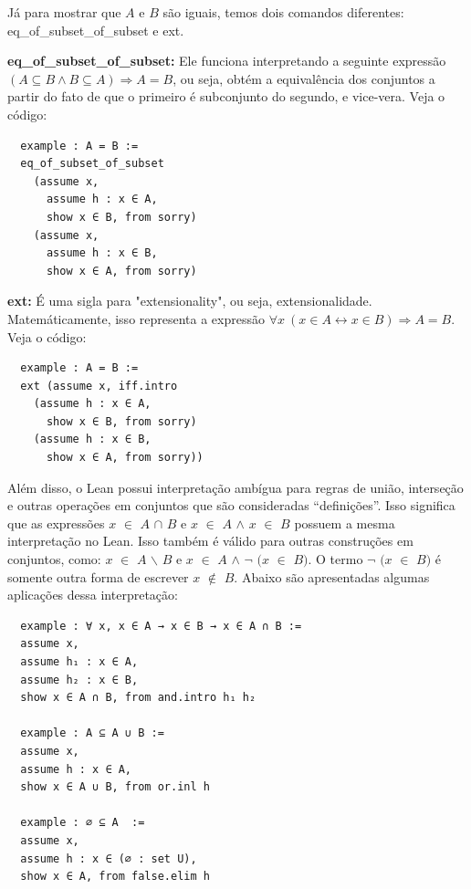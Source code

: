   Já para mostrar que $A$ e $B$ são iguais, temos dois comandos diferentes: {\selectfont eq\_of\_subset\_of\_subset} e {\selectfont ext}.

  \textbf{eq\_of\_subset\_of\_subset:} Ele funciona interpretando a seguinte expressão $(A \subseteq B \wedge B \subseteq A) \Rightarrow A=B$, ou seja, obtém a equivalência dos conjuntos a partir do fato de que o primeiro é subconjunto do segundo, e vice-vera. Veja o código:

  \begin{lstlisting}
  example : A = B :=
  eq_of_subset_of_subset
    (assume x,
      assume h : x ∈ A,
      show x ∈ B, from sorry)
    (assume x,
      assume h : x ∈ B,
      show x ∈ A, from sorry) \end{lstlisting}

  \textbf{ext:} É uma sigla para "extensionality", ou seja, extensionalidade. Matemáticamente, isso representa a expressão $\forall x \ (x \in A \leftrightarrow x \in B) \Rightarrow A=B$. Veja o código:

  \begin{lstlisting}
  example : A = B :=
  ext (assume x, iff.intro
    (assume h : x ∈ A,
      show x ∈ B, from sorry)
    (assume h : x ∈ B,
      show x ∈ A, from sorry)) \end{lstlisting}

  Além disso, o Lean possui interpretação ambígua para regras de união, interseção e outras operações em conjuntos que são consideradas “definições”. Isso significa que as expressões $x$ $\in$ $A$ $\cap$ $B$ e $x$ $\in$ $A$ $\wedge$ $x$ $\in$ $B$ possuem a mesma interpretação no Lean. Isso também é válido para outras construções em conjuntos, como: $x$ $\in$ $A$ $\backslash $ $B$ e $x$ $\in$ $A$ $\wedge$ $\neg$ $(x$ $\in$ $B)$. O termo $\neg$ $(x$ $\in$ $B)$ é somente outra forma de escrever $x$ $\notin$ $B$. Abaixo são apresentadas algumas aplicações dessa interpretação:

  \begin{lstlisting}
  example : ∀ x, x ∈ A → x ∈ B → x ∈ A ∩ B :=
  assume x,
  assume h₁ : x ∈ A,
  assume h₂ : x ∈ B,
  show x ∈ A ∩ B, from and.intro h₁ h₂

  example : A ⊆ A ∪ B :=
  assume x,
  assume h : x ∈ A,
  show x ∈ A ∪ B, from or.inl h

  example : ∅ ⊆ A  :=
  assume x,
  assume h : x ∈ (∅ : set U),
  show x ∈ A, from false.elim h \end{lstlisting}

